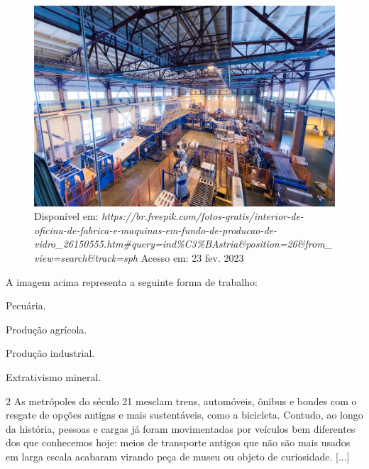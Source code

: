 \begin{itemize}
\begin{itemize}
\begin{itemize}
\begin{itemize}
{{\begin{itemize}
\begin{itemize}
\begin{figure}[htpb!]
\includegraphics[width=.5\textwidth]{./imgs/img64.png}
\caption{Disponível em: \emph{https://br.freepik.com/fotos-gratis/interior-de-oficina-de-fabrica-e-maquinas-em-fundo-de-producao-de-vidro\_26150555.htm\#query=ind\%C3\%BAstria\&position=26\&from\_view=search\&track=sph} Acesso em: 23 fev. 2023}
\end{figure}

A imagem acima representa a seguinte forma de trabalho:

\begin{escolha}
\item Pecuária.

\item Produção agrícola.

\item Produção industrial.

\item Extrativismo mineral.
\end{escolha}


\num{2} As metrópoles do século 21 mesclam trens, automóveis, ônibus e bondes
com o resgate de opções antigas e mais sustentáveis, como a bicicleta.
Contudo, ao longo da história, pessoas e cargas já foram movimentadas
por veículos bem diferentes dos que conhecemos hoje: meios de transporte
antigos que não são mais usados em larga escala acabaram virando peça de
museu ou objeto de curiosidade. [...]



\end{itemize}
\end{itemize}}}
\end{itemize}
\end{itemize}
\end{itemize}
\end{itemize}
